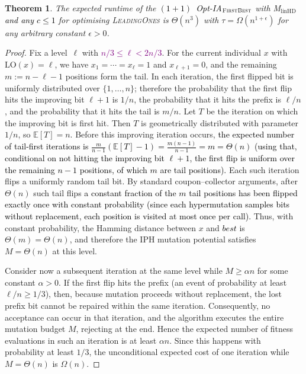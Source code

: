 \documentclass[lettersize,journal]{IEEEtran}
\newcommand{\new}[1]{\textcolor{black}{#1}}
\newcommand{\rerev}[1]{\textcolor{purple}{#1}}
\newcommand{\EE}{\mathbb{E}}
\newcommand{\linHD}{M$_{\text{linHD}}$}
\newtheorem{theorem}{Theorem}
\begin{document}
\begin{theorem}\label{thm:FBleadingones}
The expected runtime of the \new{$(1+1)$~Opt-IA$_{\textsc{FirstBest}}$}  with {\linHD } \new{and any $c\leq 1$} for optimising
\textsc{LeadingOnes} is $\Theta(n^3)$ with $\tau=\Omega(n^{1+\epsilon})$ for any arbitrary
constant $\epsilon>0$.
\end{theorem}
\begin{proof}

Fix a level~$\ell$ with \rerev{$n/3\le \ell < 2n/3$}. For the current individual $x$ with $\mathrm{LO}(x)=\ell$, we have $x_1=\cdots=x_{\ell}=1$ and $x_{\ell+1}=0$, and the remaining $m:=n-\ell-1$ positions form the tail. In each iteration, the first flipped bit is uniformly distributed over $\{1,\dots,n\}$; therefore the probability that the first flip hits the improving bit $\ell+1$ is $1/n$, the probability that it hits the prefix is $\ell/n$, and the probability that it hits the tail is $m/n$. Let $T$ be the iteration on which the improving bit is first hit. Then $T$ is geometrically distributed with parameter~$1/n$, so $\EE[T]=n$. Before this improving iteration occurs, \textcolor{black}{the expected number of tail-first iterations is
$\frac{m}{n-1}(\EE[T]-1) = \frac{m(n-1)}{n-1} = m = \Theta(n)$
(using that, conditional on not hitting the improving bit $\ell+1$, the
first flip is uniform over the remaining $n-1$ positions, of which $m$
are tail positions).} Each such iteration flips a uniformly random tail bit. By standard coupon--collector arguments, after $\Theta(n)$ such tail flips \textcolor{black}{a constant fraction of the $m$ tail positions has been flipped exactly once
with constant probability (since each hypermutation samples bits without
replacement, each position is visited at most once per call).} Thus, with constant probability, the Hamming distance between $x$ and \textcolor{black}{$\mathit{best}$} is $\Theta(m)=\Theta(n)$, and therefore the IPH mutation potential satisfies $M=\Theta(n)$ at this level.

Consider now a subsequent iteration at the same level while $M\ge \alpha n$ for some constant $\alpha>0$. If the first flip hits the prefix (an event of probability at least $\ell/n\ge 1/3$), then, because mutation proceeds without replacement, the lost prefix bit cannot be repaired within the same iteration. Consequently, no acceptance can occur in that iteration, and the algorithm executes the entire mutation budget $M$, rejecting at the end. Hence the expected number of fitness evaluations in such an iteration is at least $\alpha n$. Since this happens with probability at least $1/3$, the unconditional expected cost of one iteration while $M=\Theta(n)$ is $\Omega(n)$.


\end{proof}
\end{document}
